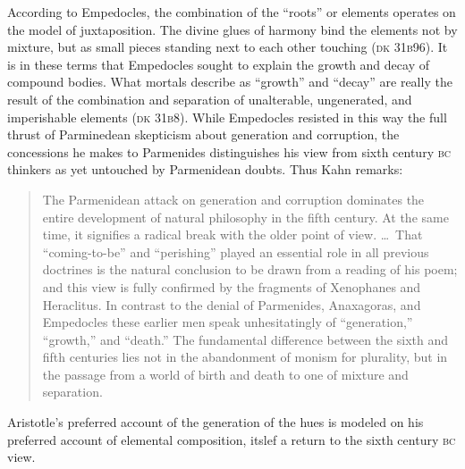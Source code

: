 According to Empedocles, the combination of the ``roots'' or elements operates on the model of juxtaposition. The divine glues of harmony bind the elements not by mixture, but as small pieces standing next to each other touching (\textsc{dk} 31\textsc{b}96). It is in these terms that Empedocles sought to explain the growth and decay of compound bodies. What mortals describe as ``growth'' and ``decay'' are really the result of the combination and separation of unalterable, ungenerated, and imperishable elements (\textsc{dk} 31\textsc{b}8). 
While Empedocles resisted in this way the full thrust of Parminedean skepticism about generation and corruption, the concessions he makes to Parmenides distinguishes his view from sixth century \textsc{bc} thinkers as yet untouched by Parmenidean doubts. Thus Kahn remarks:
\begin{quote}
	The Parmenidean attack on generation and corruption dominates the entire development of natural philosophy in the fifth century. At the same time, it signifies a radical break with the older point of view. \ldots\ That ``coming-to-be'' and ``perishing'' played an essential role in all previous doctrines is the natural conclusion to be drawn from a reading of his poem; and this view is fully confirmed by the fragments of Xenophanes and Heraclitus. In contrast to the denial of Parmenides, Anaxagoras, and Empedocles these earlier men speak unhesitatingly of ``generation,'' ``growth,'' and ``death.'' The fundamental difference between the sixth and fifth centuries lies not in the abandonment of monism for plurality, but in the passage from a world of birth and death to one of mixture and separation. \citep[154--155]{Kahn:1994qf}
\end{quote}
Aristotle's preferred account of the generation of the hues is modeled on his preferred account of elemental composition, itslef a return to the sixth century \textsc{bc} view.

